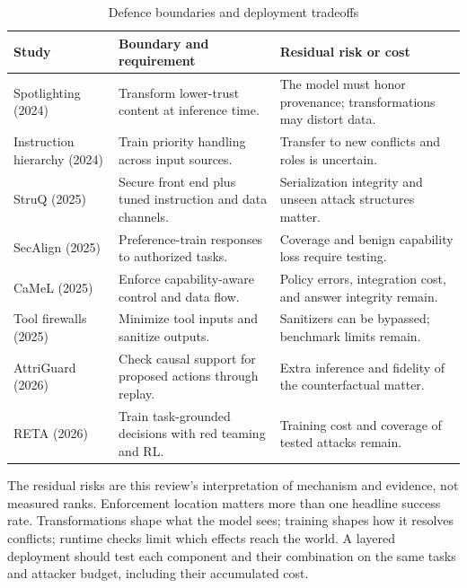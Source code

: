 \documentclass[conference]{IEEEtran}
\begin{document}
\begin{table}[!t]
\caption{Defence boundaries and deployment tradeoffs}
\label{tab:2}
\centering
\scriptsize
\renewcommand{\arraystretch}{1.1}
\begin{tabularx}{\columnwidth}{@{}>{\raggedright\arraybackslash}p{}YY@{}}
\hline
Study & Boundary and requirement & Residual risk or cost \\
\hline
Spotlighting \cite{hines2024spotlighting} (2024) & Transform lower-trust content at inference time. & The model must honor provenance; transformations may distort data. \\
Instruction hierarchy \cite{wallace2024hierarchy} (2024) & Train priority handling across input sources. & Transfer to new conflicts and roles is uncertain. \\
StruQ \cite{chen2025struq} (2025) & Secure front end plus tuned instruction and data channels. & Serialization integrity and unseen attack structures matter. \\
SecAlign \cite{chen2025secalign} (2025) & Preference-train responses to authorized tasks. & Coverage and benign capability loss require testing. \\
CaMeL \cite{debenedetti2025camel} (2025) & Enforce capability-aware control and data flow. & Policy errors, integration cost, and answer integrity remain. \\
Tool firewalls \cite{bhagwatkar2025firewalls} (2025) & Minimize tool inputs and sanitize outputs. & Sanitizers can be bypassed; benchmark limits remain. \\
AttriGuard \cite{he2026attriguard} (2026) & Check causal support for proposed actions through replay. & Extra inference and fidelity of the counterfactual matter. \\
RETA \cite{he2026reta} (2026) & Train task-grounded decisions with red teaming and RL. & Training cost and coverage of tested attacks remain. \\
\hline
\end{tabularx}
\end{table}
The residual risks are this review's interpretation of mechanism and evidence, not measured ranks. Enforcement location matters more than one headline success rate. Transformations shape what the model sees; training shapes how it resolves conflicts; runtime checks limit which effects reach the world. A layered deployment should test each component and their combination on the same tasks and attacker budget, including their accumulated cost.
\end{document}
